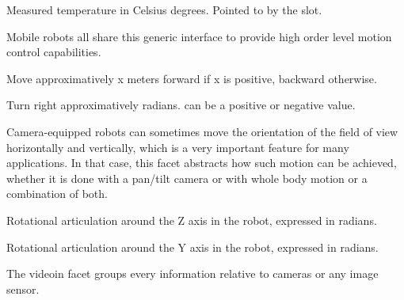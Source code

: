 \begin{slots}
  {%
    Measured temperature in Celsius degrees.  Pointed to by the
     slot.%
  }

\end{slots}


Mobile robots all share this generic interface to provide high order
level motion control capabilities.

\begin{slots}
  {%
    Move approximatively x meters forward if x is positive, backward
    otherwise.%
  }

  {%
    Turn right approximatively  radians.   can be a
    positive or negative value.%
  }

\end{slots}


Camera-equipped robots can sometimes move the orientation of the field
of view horizontally and vertically, which is a very important feature
for many applications. In that case, this facet abstracts how such
motion can be achieved, whether it is done with a pan/tilt camera or
with whole body motion or a combination of both.

\begin{slots}
  {%
    Rotational articulation around the Z axis in the robot, expressed
    in radians.%
  }

  {%
    Rotational articulation around the Y axis in the robot, expressed
    in radians.%
  }

\end{slots}


The videoin facet groups every information relative to cameras or any
image sensor.

